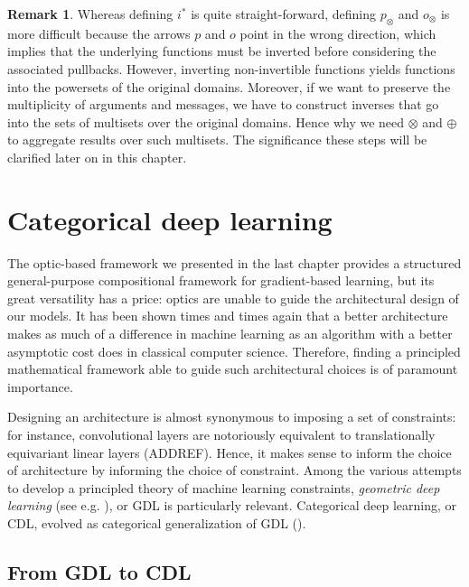 \documentclass[11pt,a4paper,openright,twoside]{report}
\theoremstyle{plain}
\theoremstyle{definition}
\newtheorem{remark}[proposition]{Remark}
\begin{document}
\begin{remark}
  Whereas defining $i^*$ is quite straight-forward, defining $p_{\otimes}$ and $o_{\otimes}$ is more difficult because the arrows $p$ and $o$ point in the wrong direction, which implies that the underlying functions must be inverted before considering the associated pullbacks. However, inverting non-invertible functions yields functions into the powersets of the original domains. Moreover, if we want to preserve the multiplicity of arguments and messages, we have to construct inverses that go into the sets of multisets over the original domains. Hence why we need $\otimes$ and $\oplus$ to aggregate results over such multisets.
  The significance these steps will be clarified later on in this chapter.
\end{remark}



\section{Categorical deep learning}

The optic-based framework we presented in the last chapter provides a structured general-purpose compositional framework for gradient-based learning, but its great versatility has a price: optics are unable to guide the architectural design of our models. It has been shown times and times again that a better architecture makes as much of a difference in machine learning as an algorithm with a better asymptotic cost does in classical computer science. 
Therefore, finding a principled mathematical framework able to guide such architectural choices is of paramount importance. 


Designing an architecture is almost synonymous to imposing a set of constraints: for instance, convolutional layers are notoriously equivalent to translationally equivariant linear layers (ADDREF).
Hence, it makes sense to inform the choice of architecture by informing the choice of constraint. Among the various attempts to develop a principled theory of machine learning constraints, \textit{geometric deep learning} (see e.g. \cite{bronstein2021geometric}), or GDL is particularly relevant. Categorical deep learning, or CDL, evolved as categorical generalization of GDL (\cite{gavranovicposition}).


\subsection{From GDL to CDL}
\end{document}
